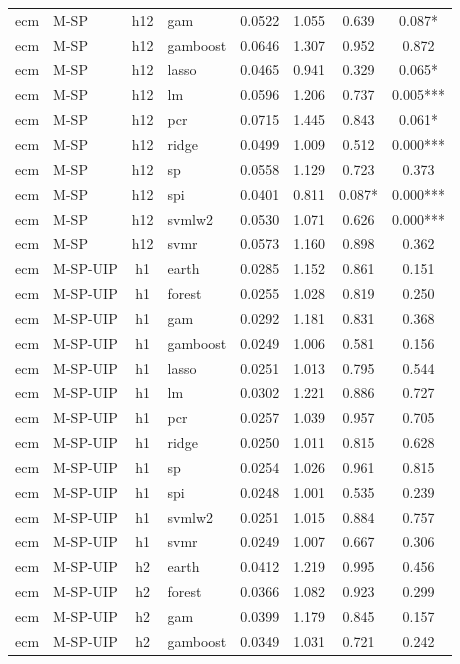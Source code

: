 \begin{ThreePartTable}
\begin{longtable}[t]{llclcccc}
ecm & M-SP & h12 & gam & 0.0522 & 1.055 & 0.639 & 0.087*\\
ecm & M-SP & h12 & gamboost & 0.0646 & 1.307 & 0.952 & 0.872\\
ecm & M-SP & h12 & lasso & 0.0465 & 0.941 & 0.329 & 0.065*\\
ecm & M-SP & h12 & lm & 0.0596 & 1.206 & 0.737 & 0.005***\\
ecm & M-SP & h12 & pcr & 0.0715 & 1.445 & 0.843 & 0.061*\\
ecm & M-SP & h12 & ridge & 0.0499 & 1.009 & 0.512 & 0.000***\\
ecm & M-SP & h12 & sp & 0.0558 & 1.129 & 0.723 & 0.373\\
ecm & M-SP & h12 & spi & 0.0401 & 0.811 & 0.087* & 0.000***\\
ecm & M-SP & h12 & svmlw2 & 0.0530 & 1.071 & 0.626 & 0.000***\\
ecm & M-SP & h12 & svmr & 0.0573 & 1.160 & 0.898 & 0.362\\
\addlinespace
ecm & M-SP-UIP & h1 & earth & 0.0285 & 1.152 & 0.861 & 0.151\\
ecm & M-SP-UIP & h1 & forest & 0.0255 & 1.028 & 0.819 & 0.250\\
ecm & M-SP-UIP & h1 & gam & 0.0292 & 1.181 & 0.831 & 0.368\\
ecm & M-SP-UIP & h1 & gamboost & 0.0249 & 1.006 & 0.581 & 0.156\\
ecm & M-SP-UIP & h1 & lasso & 0.0251 & 1.013 & 0.795 & 0.544\\
ecm & M-SP-UIP & h1 & lm & 0.0302 & 1.221 & 0.886 & 0.727\\
ecm & M-SP-UIP & h1 & pcr & 0.0257 & 1.039 & 0.957 & 0.705\\
ecm & M-SP-UIP & h1 & ridge & 0.0250 & 1.011 & 0.815 & 0.628\\
ecm & M-SP-UIP & h1 & sp & 0.0254 & 1.026 & 0.961 & 0.815\\
ecm & M-SP-UIP & h1 & spi & 0.0248 & 1.001 & 0.535 & 0.239\\
ecm & M-SP-UIP & h1 & svmlw2 & 0.0251 & 1.015 & 0.884 & 0.757\\
ecm & M-SP-UIP & h1 & svmr & 0.0249 & 1.007 & 0.667 & 0.306\\
\addlinespace
ecm & M-SP-UIP & h2 & earth & 0.0412 & 1.219 & 0.995 & 0.456\\
ecm & M-SP-UIP & h2 & forest & 0.0366 & 1.082 & 0.923 & 0.299\\
ecm & M-SP-UIP & h2 & gam & 0.0399 & 1.179 & 0.845 & 0.157\\
ecm & M-SP-UIP & h2 & gamboost & 0.0349 & 1.031 & 0.721 & 0.242\\

\end{longtable}
\end{ThreePartTable}
